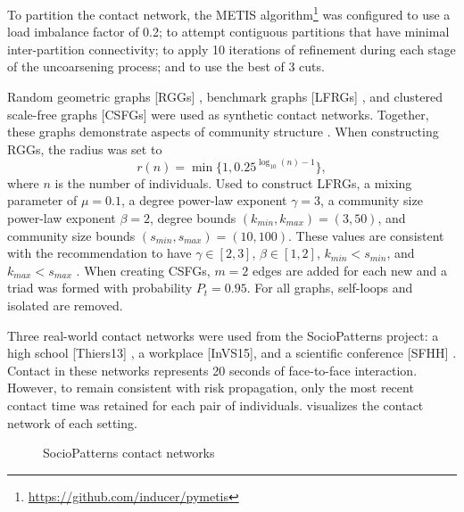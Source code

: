 To partition the contact network, the METIS algorithm\footnote{\url{https://github.com/inducer/pymetis}} \citep{Karypis1998} was configured to use a load imbalance factor of \num{0.2}; to attempt contiguous partitions that have minimal inter-partition connectivity; to apply \num{10} iterations of refinement during each stage of the uncoarsening process; and to use the best of \num{3} cuts.

Random geometric graphs [RGGs] \citep{Dall2002}, benchmark graphs [LFRGs] \citep{Lancichinetti2008}, and clustered scale-free graphs [CSFGs] \citep{Holme2002} were used as synthetic contact networks. Together, these graphs demonstrate aspects of community structure \citep{Fortunato2010}. When constructing RGGs, the radius was set to
\begin{equation*}
  r(n) = \min \{\num{1}, \num{0.25}^{\log_{10}(n) - 1}\},
\end{equation*}
where $n$ is the number of individuals. Used to construct LFRGs, a mixing parameter of $\mu = \num{0.1}$, a degree power-law exponent $\gamma = \num{3}$, a community size power-law exponent $\beta = \num{2}$, degree bounds $(k_\mathit{min}, k_\mathit{max}) = (\num{3}, \num{50})$, and community size bounds $(s_\mathit{min}, s_\mathit{max}) = (\num{10}, \num{100})$. These values are consistent with the recommendation to have $\gamma \in [\num{2}, \num{3}]$,  $\beta \in [\num{1}, \num{2}]$, $k_\mathit{min} < s_\mathit{min}$, and $k_\mathit{max} < s_\mathit{max}$ \citep{Lancichinetti2008}. When creating CSFGs, $m = \num{2}$ edges are added for each new \vertexName and a triad was formed with probability $P_t = \num{0.95}$. For all graphs, self-loops and isolated \verticesName are removed.

Three real-world contact networks were used from the SocioPatterns project: a high school [Thiers13] \citep{Fournet2014}, a workplace [InVS15], and a scientific conference [SFHH] \citep{Genois2018}. Contact in these networks represents \num{20} seconds of face-to-face interaction. However, to remain consistent with risk propagation, only the most recent contact time was retained for each pair of individuals.  visualizes the contact network of each setting.

\begin{figure}[htbp]
\centering
{}
\caption{SocioPatterns contact networks}
\label{fig:real-networks}
\end{figure}

